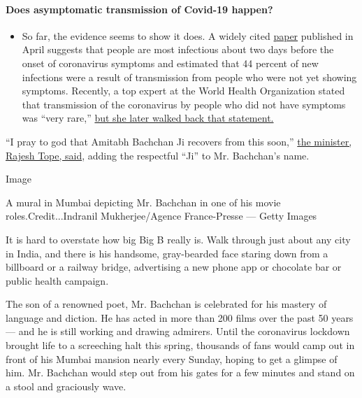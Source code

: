 \begin{itemize}
{  \paragraph{Does asymptomatic transmission of Covid-19
  happen?}\label{does-asymptomatic-transmission-of-covid-19-happen}}

  \begin{itemize}
  \tightlist
  \item
    So far, the evidence seems to show it does. A widely cited
    \href{https://www.nature.com/articles/s41591-020-0869-5}{paper}
    published in April suggests that people are most infectious about
    two days before the onset of coronavirus symptoms and estimated that
    44 percent of new infections were a result of transmission from
    people who were not yet showing symptoms. Recently, a top expert at
    the World Health Organization stated that transmission of the
    coronavirus by people who did not have symptoms was ``very rare,''
    \href{https://www.nytimes.com/2020/06/09/world/coronavirus-updates.html?action=click\&pgtype=Article\&state=default\&region=MAIN_CONTENT_3\&context=storylines_faq\#link-1f302e21}{but
    she later walked back that statement.}
  \end{itemize}
\end{itemize}

``I pray to god that Amitabh Bachchan Ji recovers from this soon,''
\href{https://twitter.com/rajeshtope11/status/1282088013716164609}{the
minister, Rajesh Tope, said}, adding the respectful ``Ji'' to Mr.
Bachchan's name.

Image

A mural in Mumbai depicting Mr. Bachchan in one of his movie
roles.Credit...Indranil Mukherjee/Agence France-Presse --- Getty Images

It is hard to overstate how big Big B really is. Walk through just about
any city in India, and there is his handsome, gray-bearded face staring
down from a billboard or a railway bridge, advertising a new phone app
or chocolate bar or public health campaign.

The son of a renowned poet, Mr. Bachchan is celebrated for his mastery
of language and diction. He has acted in more than 200 films over the
past 50 years --- and he is still working and drawing admirers. Until
the coronavirus lockdown brought life to a screeching halt this spring,
thousands of fans would camp out in front of his Mumbai mansion nearly
every Sunday, hoping to get a glimpse of him. Mr. Bachchan would step
out from his gates for a few minutes and stand on a stool and graciously
wave.

